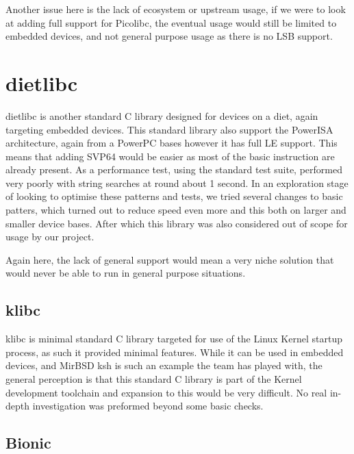 Another issue here is the lack of ecosystem or upstream usage, if we were to look at adding full support for Picolibc,
the eventual usage would still be limited to embedded devices, and not general purpose usage as there is no \acrfull{LSB} support.
\par

\section{dietlibc}

dietlibc is another standard C library designed for devices on a diet, again targeting embedded devices.
This standard library also support the PowerISA architecture, again from a PowerPC bases however it has full \acrfull{LE} support.
This means that adding SVP64 would be easier as most of the basic instruction are already present.
As a performance test, using the standard test suite, performed very poorly with string searches at round about 1 second.
In an exploration stage of looking to optimise these patterns and tests, we tried several changes to basic patters,
which turned out to reduce speed even more and this both on larger and smaller device bases.
After which this library was also considered out of scope for usage by our project.
\par

Again here, the lack of general support would mean a very niche solution that would never be able to run in general purpose situations.
\par

\subsection{klibc}
\label{content:klibc}

klibc is minimal standard C library targeted for use of the Linux Kernel startup process, as such it provided minimal features.
While it can be used in embedded devices, and MirBSD ksh is such an example the team has played with,
the general perception is that this standard C library is part of the Kernel development toolchain and expansion to this would be very difficult.
No real in-depth investigation was preformed beyond some basic checks.
\par

\subsection{Bionic}

